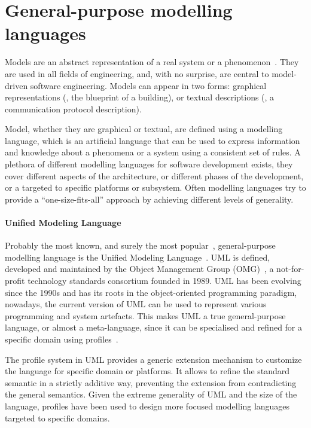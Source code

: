 \section[General-purpose modelling languages]{General-purpose modelling\\languages}
Models are an abstract representation of a real system or a phenomenon~\cite{schichl2004models}. They are used in all fields of engineering, and, with no surprise, are central to model-driven software engineering. Models can appear in two forms: graphical representations (\eg, the blueprint of a building), or textual descriptions (\eg, a communication protocol description). 

Model, whether they are graphical or textual, are defined using a modelling language, which is an artificial language that can be used to express information and knowledge about a phenomena or a system using a consistent set of rules. A plethora of different modelling languages for software development exists, they cover different aspects of the architecture, or different phases of the development, or a targeted to specific platforms or subsystem. Often modelling languages try to provide a ``one-size-fits-all'' approach by achieving different levels of generality.

\paragraph{Unified Modeling Language} Probably the most known, and surely the most popular~\cite{malavolta2012industry}, general-purpose modelling language is the Unified Modeling Language~\cite{rumbaugh2004unified}. UML is defined, developed and maintained by the Object Management Group (OMG)~\cite{omg}, a not-for-profit technology standards consortium founded in 1989. UML has been evolving since the 1990s and has its roots in the object-oriented programming paradigm, nowadays, the current version of UML can be used to represent various programming and system artefacts. This makes UML a true general-purpose language, or almost a meta-language, since it can be specialised and refined for a specific domain using profiles~\cite{fuentes2004introduction}. 

The profile system in UML provides a generic extension mechanism to customize the language for specific domain or platforms. It allows to refine the standard semantic in a strictly additive way, preventing the extension from contradicting the general semantics. Given the extreme generality of UML and the size of the language, profiles have been used to design more focused modelling languages targeted to specific domains.

